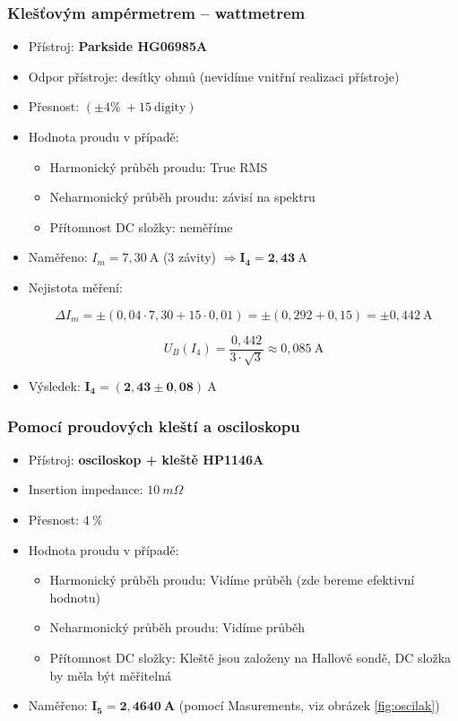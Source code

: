 \documentclass[a4paper,12pt]{article}
\begin{document}
\subsubsection{Klešťovým ampérmetrem – wattmetrem}
\begin{itemize}
  \item Přístroj: \textbf{Parkside HG06985A}
  \item Odpor přístroje: desítky ohmů (nevidíme vnitřní realizaci přístroje)
  \item Přesnost: $(\pm 4 \%\ + 15\ \mathrm{digity})$
  \item Hodnota proudu v případě:
    \begin{itemize}
      \item Harmonický průběh proudu: True RMS
      \item Neharmonický průběh proudu: závisí na spektru
      \item Přítomnost DC složky: neměříme
    \end{itemize}
  \item Naměřeno: $I_m = 7{,}30\ \mathrm{A}$ (3 závity) $\Rightarrow \mathbf{I_4 = 2{,}43\ \mathrm{A}}$
  \item Nejistota měření:

  $$
    \Delta I_m = \pm(0{,}04 \cdot 7{,}30 + 15 \cdot 0{,}01)
    = \pm(0{,}292 + 0{,}15)
    = \pm 0{,}442\ \mathrm{A}
  $$

  $$
    U_B(I_4) = \frac{0{,}442}{3\cdot \sqrt{3}} \approx 0{,}085\ \mathrm{A}
  $$

  \item Výsledek: $\mathbf{I_4 = (2{,}43 \pm 0{,}08)\ \mathrm{A}}$
\end{itemize}

\subsubsection{Pomocí proudových kleští a osciloskopu}
\begin{itemize}
  \item Přístroj: \textbf{osciloskop + kleště HP1146A}
  \item Insertion impedance: $10\ m\Omega$
  \item Přesnost: $4\ \%$
  \item Hodnota proudu v případě:
    \begin{itemize}
      \item Harmonický průběh proudu: Vidíme průběh (zde bereme efektivní hodnotu)
      \item Neharmonický průběh proudu: Vidíme průběh
      \item Přítomnost DC složky: Kleště jsou založeny na Hallově sondě, DC složka by měla být měřitelná
    \end{itemize}
  \item Naměřeno: $\mathbf{I_5 = 2,4640\ A}$ (pomocí Masurements, viz obrázek \ref{fig:oscilak})
\end{itemize}
\end{document}

